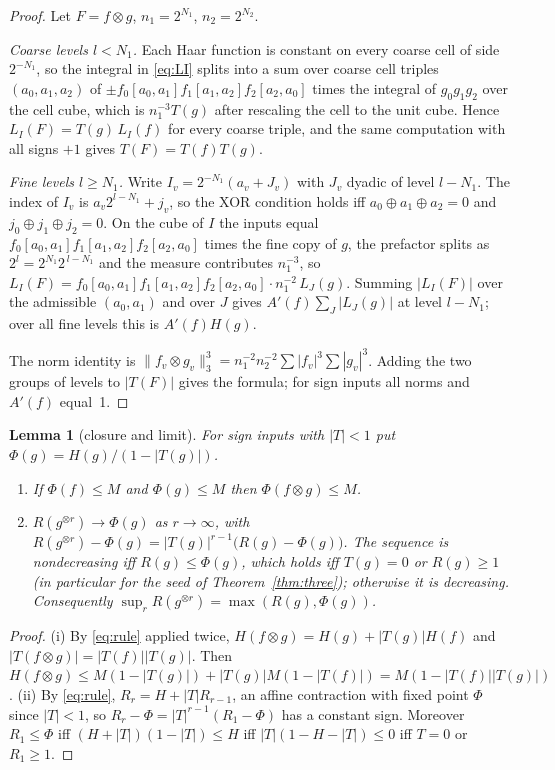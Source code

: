 \documentclass[11pt]{article}
\newtheorem{lemma}[theorem]{Lemma}
\theoremstyle{remark}
\begin{document}
\begin{proof}
Let $F=f\otimes g$, $n_1=2^{N_1}$, $n_2=2^{N_2}$.

\emph{Coarse levels $l<N_1$.} Each Haar function is constant on every coarse cell of side $2^{-N_1}$, so the integral
in \eqref{eq:LI} splits into a sum over coarse cell triples $(a_0,a_1,a_2)$ of
$\pm f_0[a_0,a_1]f_1[a_1,a_2]f_2[a_2,a_0]$ times the integral of $g_0g_1g_2$ over the cell cube, which is
$n_1^{-3}T(g)$ after rescaling the cell to the unit cube. Hence $L_I(F)=T(g)\,L_I(f)$ for every coarse triple, and the
same computation with all signs $+1$ gives $T(F)=T(f)T(g)$.

\emph{Fine levels $l\ge N_1$.} Write $I_v=2^{-N_1}(a_v+J_v)$ with $J_v$ dyadic of level $l-N_1$. The index of $I_v$ is
$a_v2^{l-N_1}+j_v$, so the XOR condition holds iff $a_0\oplus a_1\oplus a_2=0$ and $j_0\oplus j_1\oplus j_2=0$. On the
cube of $I$ the inputs equal $f_0[a_0,a_1]f_1[a_1,a_2]f_2[a_2,a_0]$ times the fine copy of $g$, the prefactor splits as
$2^{l}=2^{N_1}2^{\,l-N_1}$ and the measure contributes $n_1^{-3}$, so
$L_I(F)=f_0[a_0,a_1]f_1[a_1,a_2]f_2[a_2,a_0]\cdot n_1^{-2}\,L_J(g)$. Summing $|L_I(F)|$ over the admissible $(a_0,a_1)$
and over $J$ gives $A'(f)\sum_J|L_J(g)|$ at level $l-N_1$; over all fine levels this is $A'(f)H(g)$.

The norm identity is $\|f_v\otimes g_v\|_3^3=n_1^{-2}n_2^{-2}\sum|f_v|^3\sum|g_v|^3$. Adding the two groups of levels
to $|T(F)|$ gives the formula; for sign inputs all norms and $A'(f)$ equal~1.
\end{proof}

\begin{lemma}[closure and limit]\label{lem:closure}
For sign inputs with $|T|<1$ put $\Phi(g)=H(g)/(1-|T(g)|)$.
\begin{enumerate}
\item[(i)] If $\Phi(f)\le M$ and $\Phi(g)\le M$ then $\Phi(f\otimes g)\le M$.
\item[(ii)] $R(g^{\otimes r})\to\Phi(g)$ as $r\to\infty$, with $R(g^{\otimes r})-\Phi(g)=|T(g)|^{r-1}\big(R(g)-\Phi(g)\big)$.
The sequence is nondecreasing iff $R(g)\le\Phi(g)$, which holds iff $T(g)=0$ or $R(g)\ge1$ (in particular for the seed of
Theorem~\ref{thm:three}); otherwise it is decreasing. Consequently $\sup_rR(g^{\otimes r})=\max(R(g),\Phi(g))$.
\end{enumerate}
\end{lemma}

\begin{proof}
(i) By \eqref{eq:rule} applied twice, $H(f\otimes g)=H(g)+|T(g)|H(f)$ and $|T(f\otimes g)|=|T(f)||T(g)|$. Then
$H(f\otimes g)\le M(1-|T(g)|)+|T(g)|M(1-|T(f)|)=M(1-|T(f)||T(g)|)$.
(ii) By \eqref{eq:rule}, $R_r=H+|T|R_{r-1}$, an affine contraction with fixed point $\Phi$ since $|T|<1$, so
$R_r-\Phi=|T|^{r-1}(R_1-\Phi)$ has a constant sign. Moreover $R_1\le\Phi$ iff $(H+|T|)(1-|T|)\le H$ iff
$|T|(1-H-|T|)\le0$ iff $T=0$ or $R_1\ge1$.
\end{proof}
\end{document}
